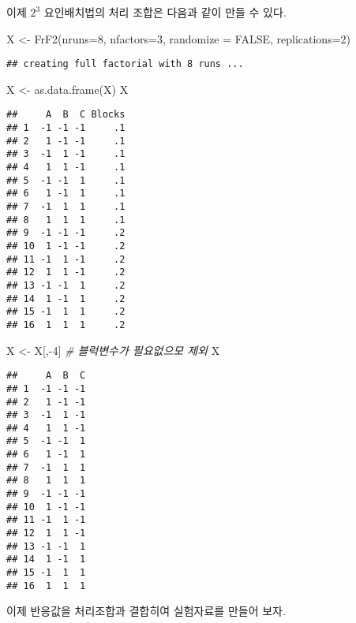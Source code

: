 \documentclass[
]{book}
\newenvironment{Shaded}{\begin{snugshade}}{\end{snugshade}}
\newcommand{\AttributeTok}[1]{\textcolor[rgb]{0.77,0.63,0.00}{#1}}
\newcommand{\CommentTok}[1]{\textcolor[rgb]{0.56,0.35,0.01}{\textit{#1}}}
\newcommand{\ConstantTok}[1]{\textcolor[rgb]{0.00,0.00,0.00}{#1}}
\newcommand{\DecValTok}[1]{\textcolor[rgb]{0.00,0.00,0.81}{#1}}
\newcommand{\FunctionTok}[1]{\textcolor[rgb]{0.00,0.00,0.00}{#1}}
\newcommand{\NormalTok}[1]{#1}
\newcommand{\OtherTok}[1]{\textcolor[rgb]{0.56,0.35,0.01}{#1}}
\newcommand{\SpecialCharTok}[1]{\textcolor[rgb]{0.00,0.00,0.00}{#1}}
\begin{document}
이제 \(2^3\) 요인배치법의 처리 조합은 다음과 같이 만들 수 있다.

\begin{Shaded}
\begin{Highlighting}[]
\NormalTok{X }\OtherTok{\textless{}{-}} \FunctionTok{FrF2}\NormalTok{(}\AttributeTok{nruns=}\DecValTok{8}\NormalTok{, }\AttributeTok{nfactors=}\DecValTok{3}\NormalTok{, }\AttributeTok{randomize =} \ConstantTok{FALSE}\NormalTok{, }\AttributeTok{replications=}\DecValTok{2}\NormalTok{)}
\end{Highlighting}
\end{Shaded}

\begin{verbatim}
## creating full factorial with 8 runs ...
\end{verbatim}

\begin{Shaded}
\begin{Highlighting}[]
\NormalTok{X }\OtherTok{\textless{}{-}} \FunctionTok{as.data.frame}\NormalTok{(X)}
\NormalTok{X}
\end{Highlighting}
\end{Shaded}

\begin{verbatim}
##     A  B  C Blocks
## 1  -1 -1 -1     .1
## 2   1 -1 -1     .1
## 3  -1  1 -1     .1
## 4   1  1 -1     .1
## 5  -1 -1  1     .1
## 6   1 -1  1     .1
## 7  -1  1  1     .1
## 8   1  1  1     .1
## 9  -1 -1 -1     .2
## 10  1 -1 -1     .2
## 11 -1  1 -1     .2
## 12  1  1 -1     .2
## 13 -1 -1  1     .2
## 14  1 -1  1     .2
## 15 -1  1  1     .2
## 16  1  1  1     .2
\end{verbatim}

\begin{Shaded}
\begin{Highlighting}[]
\NormalTok{X }\OtherTok{\textless{}{-}}\NormalTok{ X[,}\SpecialCharTok{{-}}\DecValTok{4}\NormalTok{]  }\CommentTok{\# 블럭변수가 필요없으모 제외}
\NormalTok{X}
\end{Highlighting}
\end{Shaded}

\begin{verbatim}
##     A  B  C
## 1  -1 -1 -1
## 2   1 -1 -1
## 3  -1  1 -1
## 4   1  1 -1
## 5  -1 -1  1
## 6   1 -1  1
## 7  -1  1  1
## 8   1  1  1
## 9  -1 -1 -1
## 10  1 -1 -1
## 11 -1  1 -1
## 12  1  1 -1
## 13 -1 -1  1
## 14  1 -1  1
## 15 -1  1  1
## 16  1  1  1
\end{verbatim}

이제 반응값을 처리조합과 결합히여 실험자료를 만들어 보자.
\end{document}
